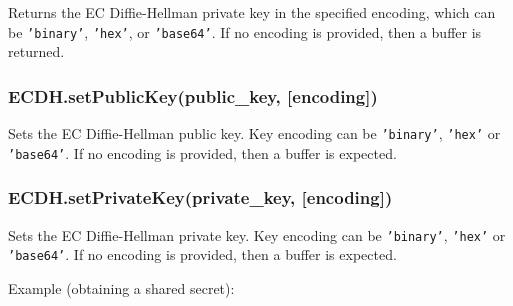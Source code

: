 Returns the EC Diffie-Hellman private key in the specified encoding,
which can be \texttt{'binary'}, \texttt{'hex'}, or \texttt{'base64'}. If
no encoding is provided, then a buffer is returned.

\subsubsection{ECDH.setPublicKey(public\_key,
{[}encoding{]})}\label{ecdh.setpublickeypublicux5fkey-encoding}

Sets the EC Diffie-Hellman public key. Key encoding can be
\texttt{'binary'}, \texttt{'hex'} or \texttt{'base64'}. If no encoding
is provided, then a buffer is expected.

\subsubsection{ECDH.setPrivateKey(private\_key,
{[}encoding{]})}\label{ecdh.setprivatekeyprivateux5fkey-encoding}

Sets the EC Diffie-Hellman private key. Key encoding can be
\texttt{'binary'}, \texttt{'hex'} or \texttt{'base64'}. If no encoding
is provided, then a buffer is expected.

Example (obtaining a shared secret):

\begin{Shaded}
\begin{Highlighting}[]
 \NormalTok{(}\NormalTok{);}
 \NormalTok{(}\NormalTok{);}
 \NormalTok{(}\NormalTok{);}

\NormalTok{();}
\NormalTok{();}

 \NormalTok{(}\NormalTok{(), }\NormalTok{, }\NormalTok{);}
 \NormalTok{(}\NormalTok{(), }\NormalTok{, }\NormalTok{);}

\end{Highlighting}
\end{Shaded}

